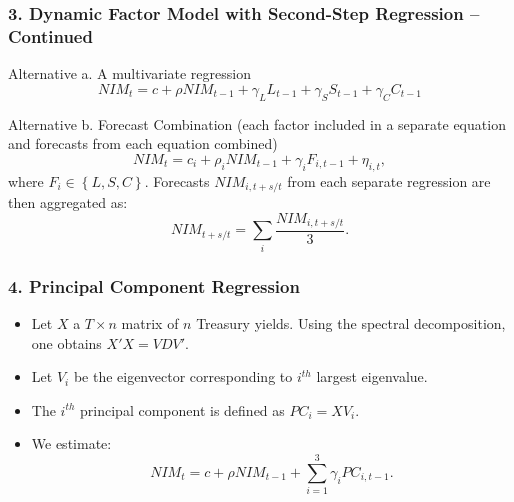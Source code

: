 \documentclass[handout]{beamer}
\newcommand{\blue}{\color{blue}}
\begin{document}
\begin{frame}

\frametitle{3. Dynamic Factor Model with Second-Step Regression -- Continued }

{\blue Alternative a.}  A multivariate regression
\begin{equation*}
NIM_{t}=c+\rho NIM_{t-1}+\gamma _{L}L_{t-1}+\gamma _{S}S_{t-1}+\gamma
_{C}C_{t-1}
\end{equation*}

{\blue Alternative b.}  Forecast Combination (each factor included in a
separate equation and forecasts from each equation combined)
\begin{equation*}
NIM_{t}=c_{i}+\rho _{i}NIM_{t-1}+\gamma _{i}F_{i,t-1}+{\eta _{i,t},}
\end{equation*}%
where $F_{i}\in \left\{ L,S,C\right\} .$ Forecasts $NIM_{i,t+s/t}$ from each
separate regression are then aggregated as:
\begin{equation*}
NIM_{t+s/t}=\sum_{i}\frac{NIM_{i,t+s/t}}{3}.
\end{equation*}

\end{frame}

\begin{frame}
\frametitle{4. Principal Component Regression}

\begin{itemize}
\item Let $X$ a $T \times n$ matrix of $n$ Treasury yields.  Using the spectral decomposition, one obtains $X'X = VDV'$.

\item Let $V_i$ be the eigenvector corresponding to $i^{th}$ largest eigenvalue.

\item The $i^{th}$ principal component is defined as $PC_i = XV_i$.

\item We estimate:
\begin{equation*}
NIM_t = c + \rho NIM_{t-1} + \sum_{i=1}^3 \gamma_i PC_{i,t-1}.
\end{equation*}
\end{itemize}

\end{frame}
\end{document}
